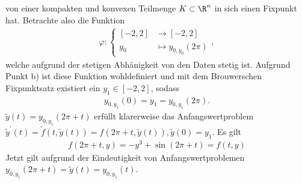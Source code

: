 \begin{solution}
\begin{enumerate}[label = \textbf{\alph*)}]
  von einer kompakten und konvexen Teilmenge $K \subset \R^n$ in sich einen Fixpunkt hat.
  Betrachte also die Funktion
  \begin{align*}
    \varphi: \begin{cases}
      [-2,2] &\to [-2,2] \\
      y_0 &\mapsto y_{0,y_0}(2\pi)
    \end{cases},
  \end{align*}
  welche aufgrund der stetigen Abhänigkeit von den Daten stetig ist.
  Aufgrund Punkt b) ist diese Funktion wohldefiniert und mit dem Brouwerschen Fixpunktsatz
  existiert ein $y_1 \in [-2,2]$, sodass
  \begin{align*}
    y_{0,y_1}(0) = y_1 = y_{0,y_1}(2\pi).
  \end{align*}
  $\widetilde{y}(t) = y_{0,y_1}(2\pi + t)$ erfüllt klarerweise das Anfangswertproblem $\widetilde{y}^{\prime}(t) =
  \widetilde{f}(t,\widetilde{y}(t)) = f(2\pi+t,\widetilde{y}(t)),
  \widetilde{y}(0) = y_1$. Es gilt
  \begin{align*}
    f(2\pi + t,y) = -y^3 + \sin(2\pi + t) = f(t,y)
  \end{align*}
  Jetzt gilt aufgrund der Eindeutigkeit von Anfangswertproblemen
  $y_{0,y_1}(2\pi + t) = \widetilde{y}(t) = y_{0,y_1}(t)$.
\end{enumerate}
\end{solution}
